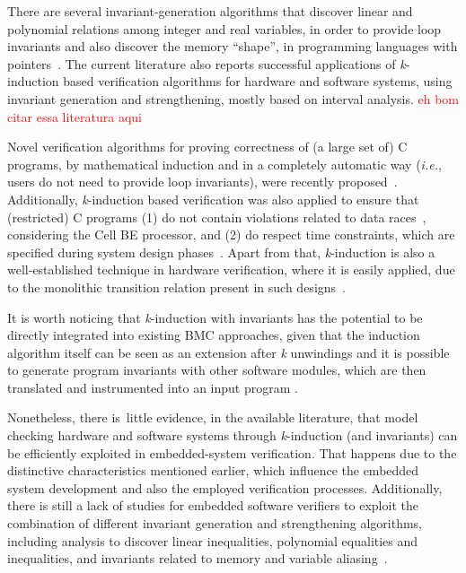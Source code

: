 \documentclass{acm_sen_article}
\begin{document}
There are several invariant-generation algorithms that discover linear and polynomial relations among integer and real variables, in order to provide loop invariants and also discover the memory ``shape'', in programming languages with pointers~\cite{pips:2013,Henry:2012}. The current literature also reports successful applications of \textit{k}-induction based verification algorithms for hardware and software systems, using invariant generation and strengthening, mostly based on interval analysis. \textcolor{red}{eh bom citar essa literatura aqui} 

Novel verification algorithms for proving correctness of (a large set of) C programs, by mathematical induction and in a completely automatic way ({\it i.e.}, users do not need to provide loop invariants), were recently proposed~\cite{Gadelha15,Beyer15,Brain15,Rocha15,Kinductor,Rocha17}. Additionally, \textit{k}-induction based verification was also applied to ensure that (restricted) C programs (1) do not contain violations related to data races~\cite{Donaldson10}, considering the Cell BE processor, and (2) do respect time constraints, which are specified during system design phases~\cite{EenS03}. Apart from that, \textit{k}-induction is also a well-established technique in hardware verification, where it is easily applied, due to the monolithic transition relation present in such designs~\cite{EenS03,Sheera00,GrosseLD09}.

It is worth noticing that \textit{k}-induction with invariants has the potential to be directly integrated into existing BMC approaches, given that the induction algorithm itself can be seen as an extension after \textit{k} unwindings and it is possible to generate program invariants with other software modules, which are then translated and instrumented into an input program \cite{Rocha15}.

Nonetheless, there is~little evidence, in the available literature, that model checking hardware and software systems through \textit{k}-induction (and invariants) can be efficiently exploited in embedded-system verification. That happens due to the distinctive characteristics mentioned earlier, which influence the embedded system development and also the employed verification processes. Additionally, there is still a lack of studies for embedded software verifiers to exploit the combination of different invariant generation and strengthening algorithms, including analysis to discover linear inequalities, polynomial equalities and inequalities, and invariants related to memory and variable aliasing~\cite{Bradley07}.
\end{document}
